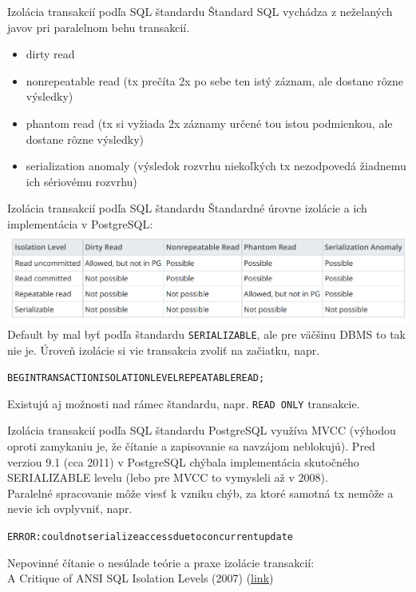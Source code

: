 \documentclass[12pt]{beamer}
\begin{document}
\begin{frame}[fragile]{Izolácia transakcií podľa SQL štandardu}
Štandard SQL vychádza z neželaných javov pri paralelnom behu transakcií.
\begin{itemize}
\item \alert{dirty read}
\item \alert{nonrepeatable read} (tx prečíta 2x po sebe ten istý záznam, ale dostane rôzne výsledky)
\item \alert{phantom read} (tx si vyžiada 2x záznamy určené tou istou podmienkou, ale dostane rôzne výsledky)
\item \alert{serialization anomaly} (výsledok rozvrhu niekoľkých tx nezodpovedá žiadnemu ich sériovému rozvrhu)
\end{itemize}
\end{frame}

\begin{frame}[fragile]{Izolácia transakcií podľa SQL štandardu}
Štandardné úrovne izolácie a ich implementácia v PostgreSQL:
\includegraphics[scale=.2]{isolationLevels.png}\\[2mm]

Default by mal byť podľa štandardu \verb|SERIALIZABLE|, ale pre väčšinu DBMS to tak nie je.
Úroveň izolácie si vie transakcia zvoliť na začiatku, napr.
\begin{alltt}
  BEGIN TRANSACTION ISOLATION LEVEL REPEATABLE READ;
\end{alltt}

Existujú aj možnosti nad rámec štandardu, napr. \verb|READ ONLY| transakcie.

\end{frame}

\begin{frame}[fragile]{Izolácia transakcií podľa SQL štandardu}
PostgreSQL využíva MVCC (výhodou oproti zamykaniu je, že čítanie a zapisovanie sa navzájom neblokujú).
Pred verziou 9.1 (cca 2011) v PostgreSQL chýbala implementácia skutočného SERIALIZABLE levelu
(lebo pre MVCC to vymysleli až v 2008).\\[5mm]

Paralelné spracovanie môže viesť k vzniku chýb, za ktoré samotná tx nemôže a nevie ich ovplyvniť, napr.
{\scriptsize
\begin{alltt}
    ERROR:  could not serialize access due to concurrent update
\end{alltt}
}

{\small
Nepovinné čítanie o nesúlade teórie a praxe izolácie transakcií:\\
A Critique of ANSI SQL Isolation Levels (2007) (\href{https://arxiv.org/abs/cs/0701157}{link})
}
\end{frame}
\end{document}
